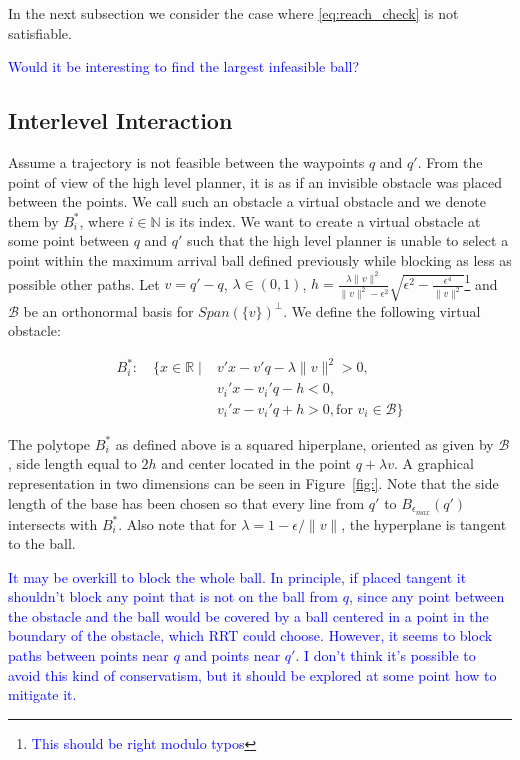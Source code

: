 \documentclass[12pt]{article}
\newcommand\fran[1]{\textcolor{blue}{#1}}
\newcommand\ffran[1]{\textcolor{blue}{\footnote{\fran{#1}}}}
\begin{document}
In the next subsection we consider the case where \eqref{eq:reach_check} is not satisfiable.

\fran{Would it be interesting to find the largest infeasible ball?}

\subsection{Interlevel Interaction}
\label{sub:interlevel_interaction}

Assume a trajectory is not feasible between the waypoints $q$ and $q'$. From the point of view of the high level planner, it is as if an invisible obstacle was placed between the points. We call such an obstacle a virtual obstacle and we denote them by $B^*_i$, where $i \in \mathbb{N}$ is its index. We want to create a virtual obstacle at some point between $q$ and $q'$ such that the high level planner is unable to select a point within the maximum arrival ball defined previously while blocking as less as possible other paths. Let $v = q' - q$, $\lambda \in (0, 1)$, $h = \frac{\lambda \|v\|^2}{\|v\|^2 - \epsilon^2} \sqrt{\epsilon^2 - \frac{\epsilon^4}{\|v\|^2}}$\ffran{This should be right modulo typos} and $\mathcal{B}$ be an orthonormal basis for $Span(\{v\})^{\bot}$. We define the following virtual obstacle:

\begin{equation}
    \label{eq:virtual_obst}
    \begin{split}
        B^*_i : \quad \{x \in \mathbb{R} \mid &v'x - v'q - \lambda \|v\|^2 > 0, \\
                                              &v_i'x - v_i'q - h < 0, \\
                                              &v_i'x - v_i'q + h > 0, \text{for } v_i \in \mathcal{B} \}
    \end{split}
\end{equation}

The polytope $B^*_i$ as defined above is a squared hiperplane, oriented as given by $\mathcal{B}$, side length equal to $2 h$ and center located in the point $q + \lambda v$. A graphical representation in two dimensions can be seen in Figure~\ref{fig:}. Note that the side length of the base has been chosen so that every line from $q'$ to $B_{\epsilon_{max}}(q')$ intersects with $B^*_i$. Also note that for $\lambda = 1 - \epsilon / \|v\|$, the hyperplane is tangent to the ball.

\fran{It may be overkill to block the whole ball. In principle, if placed tangent it shouldn't block any point that is not on the ball from $q$, since any point between the obstacle and the ball would be covered by a ball centered in a point in the boundary of the obstacle, which RRT could choose. However, it seems to block paths between points near $q$ and points near $q'$. I don't think it's possible to avoid this kind of conservatism, but it should be explored at some point how to mitigate it.}
\end{document}
